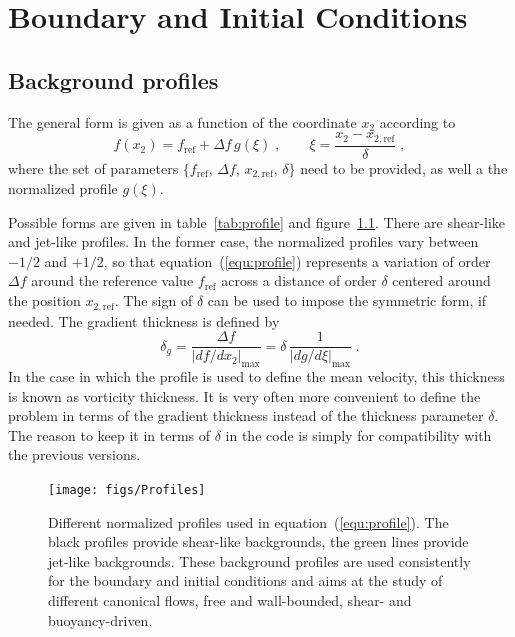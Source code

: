 \chapter{Boundary and Initial Conditions}\label{sec:bcs}

\section{Background profiles}

The general form is given as a function of the coordinate $x_2$ according to
\begin{equation}
  f(x_2) = f_\text{ref}+\Delta f\, g(\xi) \;,\qquad
  \xi=\frac{x_2-x_{2,\text{ref}}}{\delta} \;,
\label{equ:profile}
\end{equation}
where the set of parameters $\{f_\text{ref},\,\Delta
f,\,x_{2,\text{ref}},\,\delta\}$ need to be provided, as well a the normalized
profile $g(\xi)$. 

Possible forms are given in table~\ref{tab:profile} and
figure~\ref{fig:profile}. There are shear-like and jet-like profiles. In the
former case, the normalized profiles vary between $-1/2$ and $+1/2$, so that
equation~(\ref{equ:profile}) represents a variation of order $\Delta f$ around
the reference value $f_\text{ref}$ across a distance of order $\delta$ centered
around the position $x_{2,\text{ref}}$. The sign of $\delta$ can be used to
impose the symmetric form, if needed. The gradient thickness is defined by
\begin{equation}
  \delta_g =\frac{\Delta f}{|d f/d x_2|_\text{max}} =
  \delta\,\frac{1}{|d g/d \xi|_\text{max}} \;.
\label{equ:deltag}
\end{equation}
In the case in which the profile is used to define the mean velocity, this
thickness is known as vorticity thickness.  It is very often more convenient to
define the problem in terms of the gradient thickness instead of the thickness
parameter $\delta$. The reason to keep it in terms of $\delta$ in the code is
simply for compatibility with the previous versions.

\begin{figure}
\texttt{[image: figs/Profiles]}
\caption{Different normalized profiles used in equation~(\ref{equ:profile}). The
  black profiles provide shear-like backgrounds, the green lines provide
  jet-like backgrounds. These background profiles are used consistently for the
  boundary and initial conditions and aims at the study of different canonical
  flows, free and wall-bounded, shear- and buoyancy-driven.}\label{fig:profile}
\end{figure}

